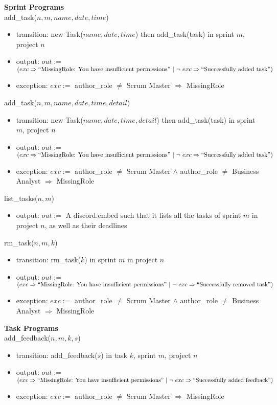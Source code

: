 \documentclass[12pt, titlepage]{article}
\begin{document}
\noindent \textbf{Sprint Programs\\}
\noindent add\_task($n, m, name, date, time$)
\begin{itemize}
    \item transition: new Task($name, date, time$) then add\_task(task) in sprint $m$, project $n$
    \item output: $out :=$ $(exc \Rightarrow ``\text{MissingRole: You have insufficient permissions}"\ |\ \lnot\ exc \Rightarrow ``\text{Successfully added task}")$
    \item exception: $exc :=$ author\_role $\neq$ Scrum Master $\Rightarrow$ MissingRole
\end{itemize}

\noindent add\_task($n, m, name, date, time, detail$)
\begin{itemize}
    \item transition: new Task($name, date, time, detail$) then add\_task(task) in sprint $m$, project $n$
    \item output: $out :=$ $(exc \Rightarrow ``\text{MissingRole: You have insufficient permissions}"\ |\ \lnot\ exc \Rightarrow ``\text{Successfully added task}")$
    \item exception: $exc :=$ author\_role $\neq$ Scrum Master $\land$ author\_role $\neq$ Business Analyst $\Rightarrow$ MissingRole
\end{itemize}

\noindent list\_tasks($n, m$)
\begin{itemize}
    \item output: $out :=$ A discord.embed such that it lists all the tasks of sprint $m$ in project $n$, as well as their deadlines
\end{itemize}

\noindent rm\_task($n, m, k$)
\begin{itemize}
    \item transition: rm\_task($k$) in sprint $m$ in project $n$
    \item output: $out :=$ $(exc \Rightarrow ``\text{MissingRole: You have insufficient permissions}"\ |\ \lnot\ exc \Rightarrow ``\text{Successfully removed task}")$
    \item exception: $exc :=$ author\_role $\neq$ Scrum Master $\land$ author\_role $\neq$ Business Analyst $\Rightarrow$ MissingRole
\end{itemize}

\noindent \textbf{Task Programs\\}
\noindent add\_feedback($n, m, k, s$)
\begin{itemize}
    \item transition: add\_feedback($s$) in task $k$, sprint $m$, project $n$
    \item output: $out :=$ $(exc \Rightarrow ``\text{MissingRole: You have insufficient permissions}"\ |\ \lnot\ exc \Rightarrow ``\text{Successfully added feedback}")$
    \item exception: $exc :=$ author\_role $\neq$ Scrum Master $\Rightarrow$ MissingRole
\end{itemize}
\end{document}
